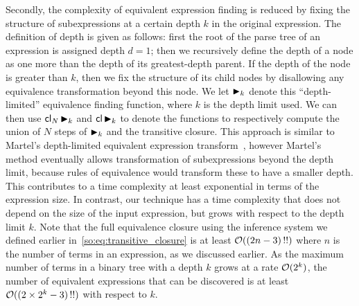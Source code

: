 Secondly, the complexity of equivalent expression finding is reduced by
fixing the structure of subexpressions at a certain depth $k$ in the original
expression.  The definition of depth is given as follows: first the root of
the parse tree of an expression is assigned depth $d = 1$; then we recursively
define the depth of a node as one more than the depth of its greatest-depth
parent.  If the depth of the node is greater than $k$, then we fix the
structure of its child nodes by disallowing any equivalence transformation
beyond this node. We let $\operatorname{\blacktriangleright}_k$ denote this ``depth-limited'' equivalence
finding function, where $k$ is the depth limit used.  We can then use
$\operatorname{\mathsf{cl}}_N \operatorname{\blacktriangleright}_k$ and $\operatorname{\mathsf{cl}} \operatorname{\blacktriangleright}_k$ to denote the functions to
respectively compute the union of $N$ steps of $\operatorname{\blacktriangleright}_k$ and the transitive
closure. This approach is similar to Martel's depth-limited equivalent
expression transform~\cite{martel07}, however Martel's method eventually allows
transformation of subexpressions beyond the depth limit, because rules of
equivalence would transform these to have a smaller depth.  This contributes
to a time complexity at least exponential in terms of the expression size.
In contrast, our technique has a time complexity that does not depend on the
size of the input expression, but grows with respect to the depth limit $k$.
Note that the full equivalence closure using the inference system we defined
earlier in~\eqref{so:eq:transitive_closure} is at least $\operatorname{\mathcal{O}}((2n - 3)\,!!)$
where $n$ is the number of terms in an expression, as we discussed earlier.  As
the maximum number of terms in a binary tree with a depth $k$ grows at a rate
$\operatorname{\mathcal{O}}(2^k)$, the number of equivalent expressions that can be discovered is at
least $\operatorname{\mathcal{O}}((2\times 2^k - 3)\,!!)$ with respect to $k$.

